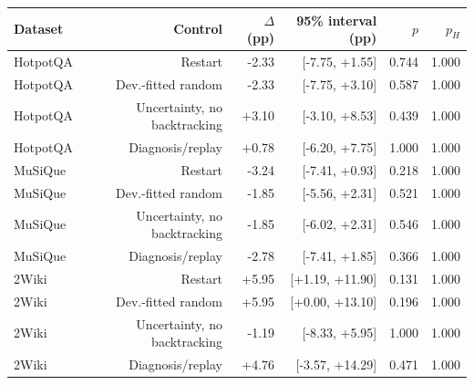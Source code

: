 \begin{tabular}{@{}lrrrrr@{}}
\toprule
Dataset & Control & $\Delta$ (pp) & 95\% interval (pp) & $p$ & $p_H$ \\
\midrule
HotpotQA & Restart & -2.33 & [-7.75, +1.55] & 0.744 & 1.000 \\
HotpotQA & Dev.-fitted random & -2.33 & [-7.75, +3.10] & 0.587 & 1.000 \\
HotpotQA & Uncertainty, no backtracking & +3.10 & [-3.10, +8.53] & 0.439 & 1.000 \\
HotpotQA & Diagnosis/replay & +0.78 & [-6.20, +7.75] & 1.000 & 1.000 \\
MuSiQue & Restart & -3.24 & [-7.41, +0.93] & 0.218 & 1.000 \\
MuSiQue & Dev.-fitted random & -1.85 & [-5.56, +2.31] & 0.521 & 1.000 \\
MuSiQue & Uncertainty, no backtracking & -1.85 & [-6.02, +2.31] & 0.546 & 1.000 \\
MuSiQue & Diagnosis/replay & -2.78 & [-7.41, +1.85] & 0.366 & 1.000 \\
2Wiki & Restart & +5.95 & [+1.19, +11.90] & 0.131 & 1.000 \\
2Wiki & Dev.-fitted random & +5.95 & [+0.00, +13.10] & 0.196 & 1.000 \\
2Wiki & Uncertainty, no backtracking & -1.19 & [-8.33, +5.95] & 1.000 & 1.000 \\
2Wiki & Diagnosis/replay & +4.76 & [-3.57, +14.29] & 0.471 & 1.000 \\
\bottomrule
\end{tabular}

